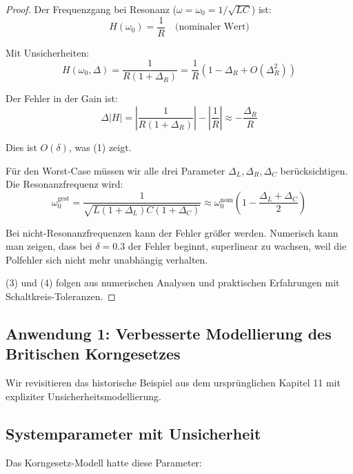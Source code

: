 \documentclass[a4paper, 12pt, twoside, openright]{report}
\theoremstyle{definition}
\theoremstyle{definition}
\begin{document}
\begin{proof}

Der Frequenzgang bei Resonanz ($\omega = \omega_0 = 1/\sqrt{LC}$) ist:
\begin{equation}
H(\omega_0) = \frac{1}{R} \quad \text{(nominaler Wert)}
\end{equation}

Mit Unsicherheiten:
\begin{equation}
H(\omega_0, \Delta) = \frac{1}{R(1+\Delta_R)} = \frac{1}{R}(1 - \Delta_R + O(\Delta_R^2))
\end{equation}

Der Fehler in der Gain ist:
\begin{equation}
\Delta |H| = \left|\frac{1}{R(1+\Delta_R)}\right| - \left|\frac{1}{R}\right| \approx -\frac{\Delta_R}{R}
\end{equation}

Dies ist $O(\delta)$, was (1) zeigt.

Für den Worst-Case müssen wir alle drei Parameter $\Delta_L, \Delta_R, \Delta_C$ berücksichtigen. Die Resonanzfrequenz wird:
\begin{equation}
\omega_0^{\text{gest}} = \frac{1}{\sqrt{L(1+\Delta_L)C(1+\Delta_C)}} \approx \omega_0^{\text{nom}} \left(1 - \frac{\Delta_L + \Delta_C}{2}\right)
\end{equation}

Bei nicht-Resonanzfrequenzen kann der Fehler größer werden. Numerisch kann man zeigen, dass bei $\delta = 0.3$ der Fehler beginnt, superlinear zu wachsen, weil die Polfehler sich nicht mehr unabhängig verhalten.

(3) und (4) folgen aus numerischen Analysen und praktischen Erfahrungen mit Schaltkreis-Toleranzen.

\end{proof}

\subsection{Anwendung 1: Verbesserte Modellierung des Britischen Korngesetzes}

Wir revisitieren das historische Beispiel aus dem ursprünglichen Kapitel 11 mit expliziter Unsicherheitsmodellierung.

\subsection{Systemparameter mit Unsicherheit}

Das Korngesetz-Modell hatte diese Parameter:
\end{document}
